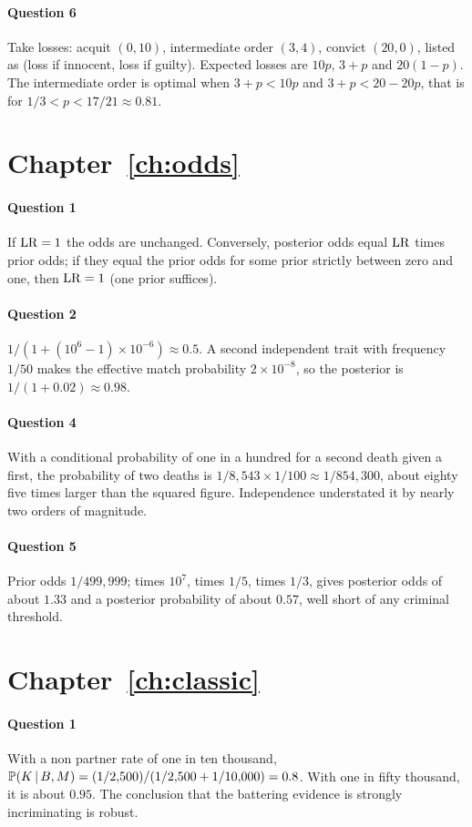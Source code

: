 \paragraph{Question 6} Take losses: acquit $(0, 10)$, intermediate order $(3, 4)$, convict $(20, 0)$, listed as (loss if innocent, loss if guilty). Expected losses are $10p$, $3 + p$ and $20(1-p)$. The intermediate order is optimal when $3 + p < 10p$ and $3 + p < 20 - 20p$, that is for $1/3 < p < 17/21\approx 0.81$.

\section*{Chapter~\ref{ch:odds}}
\paragraph{Question 1} If $\mathrm{LR} = 1$ the odds are unchanged. Conversely, posterior odds equal $\mathrm{LR}$ times prior odds; if they equal the prior odds for some prior strictly between zero and one, then $\mathrm{LR} = 1$ (one prior suffices).
\paragraph{Question 2} $1/(1 + (10^6-1)\times 10^{-6})\approx 0.5$. A second independent trait with frequency $1/50$ makes the effective match probability $2\times 10^{-8}$, so the posterior is $1/(1 + 0.02)\approx 0.98$.
\paragraph{Question 4} With a conditional probability of one in a hundred for a second death given a first, the probability of two deaths is $1/8{,}543\times 1/100 \approx 1/854{,}300$, about eighty five times larger than the squared figure. Independence understated it by nearly two orders of magnitude.
\paragraph{Question 5} Prior odds $1/499{,}999$; times $10^7$, times $1/5$, times $1/3$, gives posterior odds of about $1.33$ and a posterior probability of about $0.57$, well short of any criminal threshold.

\section*{Chapter~\ref{ch:classic}}
\paragraph{Question 1} With a non partner rate of one in ten thousand, $\mathbb{P}(K\,\vert\, B, M) = (1/2{,}500)/(1/2{,}500 + 1/10{,}000) = 0.8$. With one in fifty thousand, it is about $0.95$. The conclusion that the battering evidence is strongly incriminating is robust.
